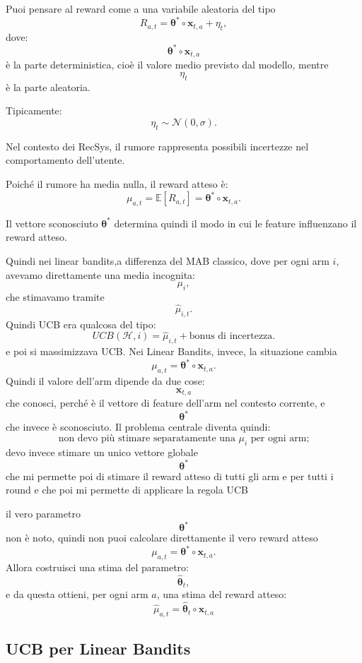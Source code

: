 Puoi pensare al reward come a una variabile aleatoria del tipo
\[
R_{a,t}
=
\boldsymbol{\theta}^*\circ \mathbf{x}_{t,a}
+
\eta_t,
\]
dove:
\[
\boldsymbol{\theta}^*\circ \mathbf{x}_{t,a}
\]
è la parte deterministica, cioè il valore medio previsto dal modello, mentre
\[
\eta_t
\]
è la parte aleatoria.


Tipicamente:
\[
\eta_t\sim\mathcal{N}(0,\sigma).
\]

Nel contesto dei RecSys, il rumore rappresenta possibili incertezze nel comportamento dell'utente.

Poiché il rumore ha media nulla, il reward atteso è:
\[
\mu_{a,t}
=
\mathbb{E}[R_{a,t}]
=
\boldsymbol{\theta}^{*}
\circ
\mathbf{x}_{t,a}.
\]

Il vettore sconosciuto $\boldsymbol{\theta}^{*}$ determina quindi il modo in cui le feature influenzano il reward atteso.

Quindi nei linear bandits,a differenza del MAB classico, dove per ogni arm \(i\), avevamo direttamente una media incognita:
\[
\mu_i,
\]
che stimavamo tramite
\[
\widehat{\mu}_{i,t}.
\]
Quindi UCB era qualcosa del tipo:
\[
UCB(\mathcal H,i)
=
\widehat{\mu}_{i,t}
+
\text{bonus di incertezza}.
\]
e poi si massimizzava UCB.
Nei Linear Bandits, invece, la situazione cambia 
\[
\mu_{a,t}
=
\boldsymbol{\theta}^{*}\circ \mathbf{x}_{t,a}.
\]
Quindi il valore dell’arm dipende da due cose:
\[
\mathbf{x}_{t,a}
\]
che conosci, perché è il vettore di feature dell’arm nel contesto corrente, e
\[
\boldsymbol{\theta}^{*}
\]
che invece è sconosciuto.
Il problema centrale diventa quindi:
\[
\boxed{
\text{non devo più stimare separatamente una }\mu_i\text{ per ogni arm;}
}
\]
devo invece stimare un unico vettore globale
\[
\boxed{
\boldsymbol{\theta}^{*}
}
\]
che mi permette poi di stimare il reward atteso di tutti gli arm e per tutti i round e che poi mi permette di applicare la regola UCB


il vero parametro
\[
\boldsymbol{\theta}^*
\]
non è noto, quindi non puoi calcolare direttamente il vero reward atteso
\[
\mu_{a,t}
=
\boldsymbol{\theta}^*
\circ
\mathbf{x}_{t,a}.
\]
Allora costruisci una stima del parametro:
\[
\widehat{\boldsymbol{\theta}}_t,
\]
e da questa ottieni, per ogni arm \(a\), una stima del reward atteso:
\[
\boxed{
\widehat{\mu}_{a,t}
=
\widehat{\boldsymbol{\theta}}_t
\circ
\mathbf{x}_{t,a}
}
\]

\subsection{UCB per Linear Bandits}

